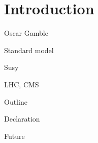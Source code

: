 \chapter{Introduction}
\label{chap:introduction}



%
{Oscar Gamble}


Standard model

Susy

LHC, CMS

Outline 

Declaration

Future

%
